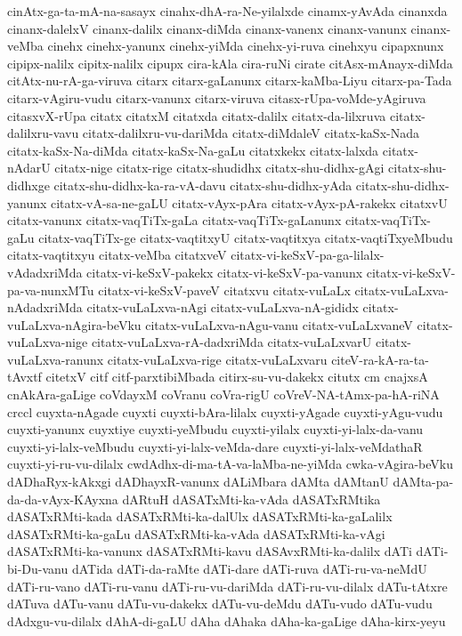 {cinAtx-ga-ta-mA-na-sasayx
cinahx-dhA-ra-Ne-yilalxde
cinamx-yAvAda
cinanxda
cinanx-dalelxV
cinanx-dalilx
cinanx-diMda
cinanx-vanenx
cinanx-vanunx
cinanx-veMba
cinehx
cinehx-yanunx
cinehx-yiMda
cinehx-yi-ruva
cinehxyu
cipapxnunx
cipipx-nalilx
cipitx-nalilx
cipupx
cira-kAla
cira-ruNi
cirate
citAsx-mAnayx-diMda
citAtx-nu-rA-ga-viruva
citarx
citarx-gaLanunx
citarx-kaMba-Liyu
citarx-pa-Tada
citarx-vAgiru-vudu
citarx-vanunx
citarx-viruva
citasx-rUpa-voMde-yAgiruva
citasxvX-rUpa
citatx
citatxM
citatxda
citatx-dalilx
citatx-da-lilxruva
citatx-dalilxru-vavu
citatx-dalilxru-vu-dariMda
citatx-diMdaleV
citatx-kaSx-Nada
citatx-kaSx-Na-diMda
citatx-kaSx-Na-gaLu
citatxkekx
citatx-lalxda
citatx-nAdarU
citatx-nige
citatx-rige
citatx-shudidhx
citatx-shu-didhx-gAgi
citatx-shu-didhxge
citatx-shu-didhx-ka-ra-vA-davu
citatx-shu-didhx-yAda
citatx-shu-didhx-yanunx
citatx-vA-sa-ne-gaLU
citatx-vAyx-pAra
citatx-vAyx-pA-rakekx
citatxvU
citatx-vanunx
citatx-vaqTiTx-gaLa
citatx-vaqTiTx-gaLanunx
citatx-vaqTiTx-gaLu
citatx-vaqTiTx-ge
citatx-vaqtitxyU
citatx-vaqtitxya
citatx-vaqtiTxyeMbudu
citatx-vaqtitxyu
citatx-veMba
citatxveV
citatx-vi-keSxV-pa-ga-lilalx-vAdadxriMda
citatx-vi-keSxV-pakekx
citatx-vi-keSxV-pa-vanunx
citatx-vi-keSxV-pa-va-nunxMTu
citatx-vi-keSxV-paveV
citatxvu
citatx-vuLaLx
citatx-vuLaLxva-nAdadxriMda
citatx-vuLaLxva-nAgi
citatx-vuLaLxva-nA-gididx
citatx-vuLaLxva-nAgira-beVku
citatx-vuLaLxva-nAgu-vanu
citatx-vuLaLxvaneV
citatx-vuLaLxva-nige
citatx-vuLaLxva-rA-dadxriMda
citatx-vuLaLxvarU
citatx-vuLaLxva-ranunx
citatx-vuLaLxva-rige
citatx-vuLaLxvaru
citeV-ra-kA-ra-ta-tAvxtf
citetxV
citf
citf-parxtibiMbada
citirx-su-vu-dakekx
citutx
cm
cnajxsA
cnAkAra-gaLige
coVdayxM
coVranu
coVra-rigU
coVreV-NA-tAmx-pa-hA-riNA
crccl
cuyxta-nAgade
cuyxti
cuyxti-bAra-lilalx
cuyxti-yAgade
cuyxti-yAgu-vudu
cuyxti-yanunx
cuyxtiye
cuyxti-yeMbudu
cuyxti-yilalx
cuyxti-yi-lalx-da-vanu
cuyxti-yi-lalx-veMbudu
cuyxti-yi-lalx-veMda-dare
cuyxti-yi-lalx-veMdathaR
cuyxti-yi-ru-vu-dilalx
cwdAdhx-di-ma-tA-va-laMba-ne-yiMda
cwka-vAgira-beVku
dADhaRyx-kAkxgi
dADhayxR-vanunx
dALiMbara
dAMta
dAMtanU
dAMta-pa-da-da-vAyx-KAyxna
dARtuH
dASATxMti-ka-vAda
dASATxRMtika
dASATxRMti-kada
dASATxRMti-ka-dalUlx
dASATxRMti-ka-gaLalilx
dASATxRMti-ka-gaLu
dASATxRMti-ka-vAda
dASATxRMti-ka-vAgi
dASATxRMti-ka-vanunx
dASATxRMti-kavu
dASAvxRMti-ka-dalilx
dATi
dATi-bi-Du-vanu
dATida
dATi-da-raMte
dATi-dare
dATi-ruva
dATi-ru-va-neMdU
dATi-ru-vano
dATi-ru-vanu
dATi-ru-vu-dariMda
dATi-ru-vu-dilalx
dATu-tAtxre
dATuva
dATu-vanu
dATu-vu-dakekx
dATu-vu-deMdu
dATu-vudo
dATu-vudu
dAdxgu-vu-dilalx
dAhA-di-gaLU
dAha
dAhaka
dAha-ka-gaLige
dAha-kirx-yeyu
}
